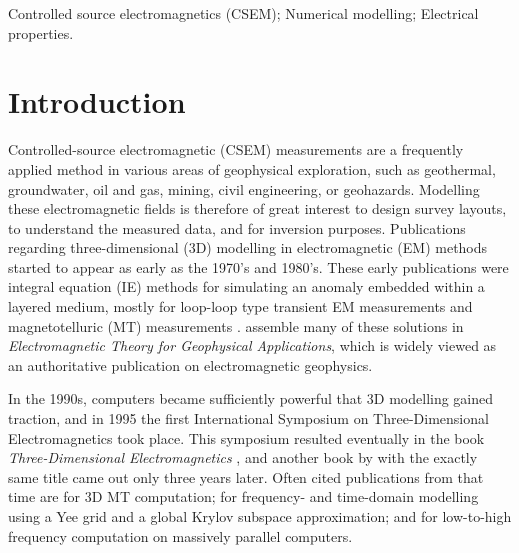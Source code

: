 \documentclass[extra, camera,%
]{gji}
\begin{document}
\begin{keywords}
  Controlled source electromagnetics (CSEM); Numerical modelling; Electrical properties.
\end{keywords}


\section{Introduction}

Controlled-source electromagnetic (CSEM) measurements are a frequently applied method in various areas of geophysical exploration, such as geothermal, groundwater, oil and gas, mining, civil engineering, or geohazards. Modelling these electromagnetic fields is therefore of great interest to design survey layouts, to understand the measured data, and for inversion purposes. Publications regarding three-dimensional (3D) modelling in electromagnetic (EM) methods started to appear as early as the 1970's and 1980's. These early publications were integral equation (IE) methods for simulating an anomaly embedded within a layered medium, mostly for loop-loop type transient EM measurements  \citep{GJI.74.Raiche, GEO.75.Hohmann, GJI.82.Das, GEO.86.Newman} and magnetotelluric (MT) measurements \citep{GEO.84.Wannamaker}. \cite{B.SEG.88.Ward} assemble many of these solutions in \emph{Electromagnetic Theory for Geophysical Applications}, which is widely viewed as an authoritative publication on electromagnetic geophysics.

In the 1990s, computers became sufficiently powerful that 3D modelling gained traction, and in 1995 the first International Symposium on Three-Dimensional Electromagnetics took place. This symposium resulted eventually in the book \emph{Three-Dimensional Electromagnetics} \citep{B.SEG.99.Oristaglio}, and another book by \cite{B.02.Wannamaker} with the exactly same title came out only three years later. Often cited publications from that time are \cite{RSC.94.Mackie} for 3D MT computation; \cite{RS.94.Druskin} for frequency- and time-domain modelling using a Yee grid and a global Krylov subspace approximation; and \cite{RS.96.Alumbaugh, GJI.97.Newman} for low-to-high frequency computation on massively parallel computers.
\end{document}
